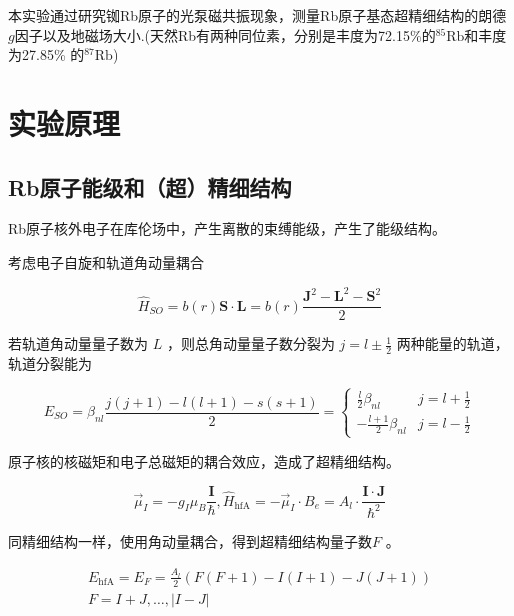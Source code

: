 \documentclass[10pt,hyperref,a4paper,UTF8]{ctexart}
\begin{document}
        本实验\cite{2007近代物理实验}通过研究铷Rb原子的光泵磁共振现象，测量Rb原子基态超精细结构的朗德$g$因子以及地磁场大小.(天然Rb有两种同位素，分别是丰度为72.15\%的$^{85}\mathrm{Rb}$和丰度为27.85\%
        的$^{87}\mathrm{Rb}$)
\section{实验原理}
        \subsection{Rb原子能级和（超）精细结构}
                Rb原子核外电子在库伦场中，产生离散的束缚能级，产生了能级结构。

                考虑电子自旋和轨道角动量耦合
                
                \begin{equation}        
                \hat{H}_{S O}=b(r) \mathbf{S} \cdot \mathbf{L}=b(r) \frac{\mathbf{J}^{2}-\mathbf{L}^{2}-\mathbf{S}^{2}}{2}
                \end{equation}

                
                若轨道角动量量子数为 $L$ ，则总角动量量子数分裂为 $j=l \pm \frac{1}{2}$ 两种能量的轨道，轨道分裂能为
                
                \begin{equation}
                E_{S O}=\beta_{n l} \frac{j(j+1)-l(l+1)-s(s+1)}{2}= \begin{cases}\frac{l}{2} \beta_{n l} & j=l+\frac{1}{2} \\ -\frac{l+1}{2} \beta_{n l} & j=l-\frac{1}{2}\end{cases}
                \end{equation}
                
                原子核的核磁矩和电子总磁矩的耦合效应，造成了超精细结构。
                
                \begin{equation} 
                \vec{\mu}_{I}=-g_{I} \mu_{B} \frac{\mathbf{I}}{\hbar}, \hat{H}_{\mathrm{hfA}}=-\vec{\mu}_{I} \cdot B_{e}=A_{l} \cdot \frac{\mathbf{I} \cdot \mathbf{J}}{\hbar^{2}}
                \end{equation}
                
                同精细结构一样，使用角动量耦合，得到超精细结构量子数$F$ 。
                
                \begin{equation} 
                \begin{gathered}
                E_{\mathrm{hfA}}=E_{F}=\frac{A_{l}}{2}(F(F+1)-I(I+1)-J(J+1)) \\
                F=I+J, \ldots,|I-J|
                \end{gathered}
                \end{equation}
                
\end{document}
